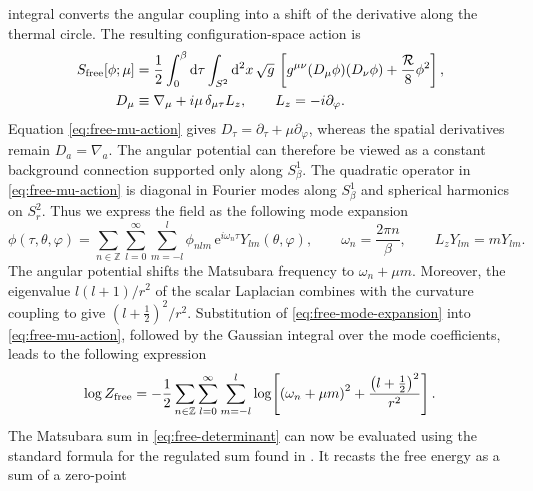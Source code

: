 \documentclass[a4paper,11pt]{article}
\newcommand{\e}{\mathrm e}
\newcommand{\dd}{\mathrm d}
\begin{document}
integral converts the angular coupling into a shift of the derivative along
the thermal circle.
The resulting configuration-space action is
\begin{equation}
\begin{aligned}
 S_{\rm free}[\phi;\mu]
 & =\frac12\int_0^\beta\dd\tau\int_{S^2}\dd^2x\,\sqrt g\,
 \left[
 g^{\mu\nu}(D_\mu\phi)(D_\nu\phi)
 +\frac{\mathcal R}{8}\phi^2
 \right],
 \\
 D_\mu
 & \equiv\nabla_\mu+i\mu\,\delta_{\mu\tau}L_z,
 \qquad L_z=-i\partial_\varphi .
 \label{eq:free-mu-action}
\end{aligned}
\end{equation}
Equation \eqref{eq:free-mu-action} gives
$D_\tau=\partial_\tau+\mu\partial_\varphi$, whereas the spatial
derivatives remain $D_a=\nabla_a$.  The angular potential can therefore be
viewed as a constant background connection supported only along
$S^1_\beta$.
The quadratic operator in \eqref{eq:free-mu-action} is diagonal in Fourier
modes along $S^1_\beta$ and spherical harmonics on $S^2_r$.  Thus we express the field as the following mode expansion
\begin{equation}
 \phi(\tau,\theta,\varphi)
 =\sum_{n\in\mathbb Z}\sum_{l=0}^{\infty}\sum_{m=-l}^{l}
 \phi_{nlm}\,\e^{i\omega_n\tau}Y_{lm}(\theta,\varphi),
 \qquad
 \omega_n=\frac{2\pi n}{\beta},
 \qquad
 L_zY_{lm}=mY_{lm}.
 \label{eq:free-mode-expansion}
\end{equation}
The angular potential shifts
the Matsubara frequency to $\omega_n+\mu m$.  Moreover, the eigenvalue
$l(l+1)/r^2$ of the scalar
Laplacian combines with the curvature coupling to give
$(l+\tfrac12)^2/r^2$.  Substitution of
\eqref{eq:free-mode-expansion} into \eqref{eq:free-mu-action}, followed by the
Gaussian integral over the mode coefficients, leads to the following expression
\begin{equation}
 \log Z_{\rm free}
 =-\frac12\sum_{n\in\mathbb Z}\sum_{l=0}^{\infty}\sum_{m=-l}^{l}
 \log\!\left[
 \left(\omega_n+\mu m\right)^2
 +\frac{\left(l+\tfrac12\right)^2}{r^2}
 \right].
 \label{eq:free-determinant}
\end{equation}
The  Matsubara sum in \eqref{eq:free-determinant} can now be
evaluated using the standard formula for the regulated sum found in 
\cite{Klebanov:2011uf}.  It recasts the free energy as a sum of a zero-point
\end{document}

